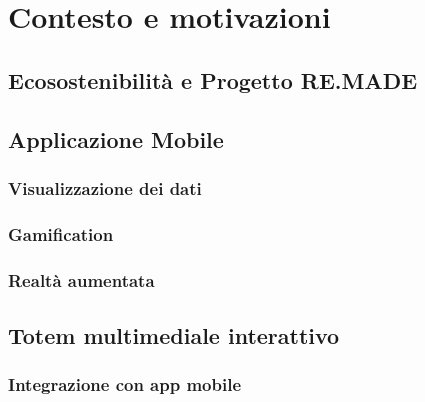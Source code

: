 \chapter{Contesto e motivazioni}
\section{Ecosostenibilità e Progetto RE.MADE}
\section{Applicazione Mobile}
\subsection{Visualizzazione dei dati}
\subsection{Gamification}
\subsection{Realtà aumentata}
\section{Totem multimediale interattivo}
\subsection{Integrazione con app mobile}
